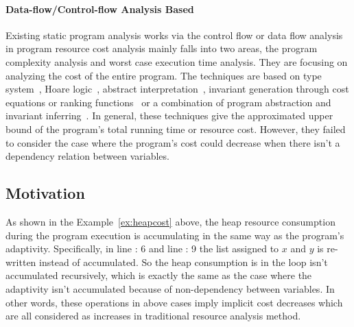 \paragraph*{Data-flow/Control-flow Analysis Based}
Existing static program analysis works via the control flow or data flow analysis 
in program resource cost analysis 
mainly falls into two areas, the program complexity analysis and worst case execution time analysis. 
They are focusing on analyzing the cost of the entire program. 
The techniques are based on
type system~\cite{CicekBG0H17, RajaniG0021}, Hoare logic~\cite{CarbonneauxHS15}, abstract interpretation~\cite{GustafssonEL05, HumenbergerJK18},
invariant generation through cost equations or ranking functions~\cite{BrockschmidtEFFG16,AlbertAGP08,AliasDFG10,Flores-MontoyaH14}
or a combination of program abstraction and invariant inferring~\cite{GulwaniZ10, SinnZV17,GulwaniJK09}.
In general, these techniques give the approximated upper bound of the program's total running time or resource cost.
However, they failed to consider the case where the program's cost could decrease when there isn't a dependency relation between variables.

\subsection*{Motivation}
\label{subsubsec:furthers-cost-example}
As shown in the Example~\ref{ex:heapcost} above, the heap resource consumption during the program 
execution is accumulating in the same way as the program's adaptivity. 
Specifically, in line : 6 and line :  9
the list assigned to $x$ and $y$ is re-written instead of accumulated.
So the heap consumption is in the loop isn't accumulated recursively, which is exactly
the same as the case where the adaptivity isn't accumulated because of non-dependency between variables.
In other words, these operations in above cases imply implicit cost decreases 
which are all considered as increases in traditional resource analysis 
method.


